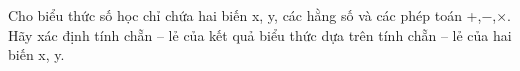 Cho biểu thức số học chỉ chứa hai biến x, y, các hằng số và các phép toán +,−,×. Hãy xác định tính chẵn – lẻ của kết quả biểu thức dựa trên tính chẵn – lẻ của hai biến x, y.  

\